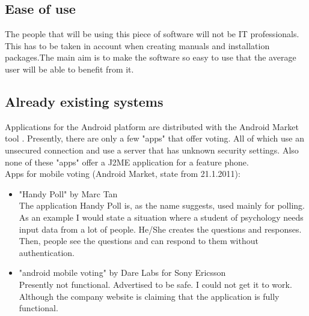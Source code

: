\documentclass[11pt,twoside,a4paper]{book}
\begin{document}
\subsection{Ease of use}
The people that will be using this piece of software will not be IT professionals. This has to be taken in account when creating manuals and installation packages.The main aim is to make the software so easy to use that the average user will be able to benefit from it.
%










\subsection{Already existing systems}
Applications for the Android platform are distributed with the Android Market tool \cite{MarketAnd}. Presently, there are only a few "apps"  that offer voting. All of which use an unsecured connection and use a server that has unknown security settings. Also none of these "apps" offer a J2ME application for a feature phone. \\
Apps for mobile voting (Android Market, state from 21.1.2011): 
\begin{itemize}
\item "Handy Poll" by Marc Tan \cite{HandyPoll} \\
The application Handy Poll is, as the name suggests, used mainly for polling. As an example I would state a situation where a student of psychology needs input data from a lot of people. He/She creates the questions and responses. Then, people see the questions and can respond to them without authentication.
\item "android mobile voting" by Dare Labs for Sony Ericsson \cite{DareLabs}\\
Presently not functional. Advertised to be safe. I could not get it to work. Although the company website \cite{DareLabsWeb} is claiming that the application is fully functional.
\end{itemize}
\end{document}
